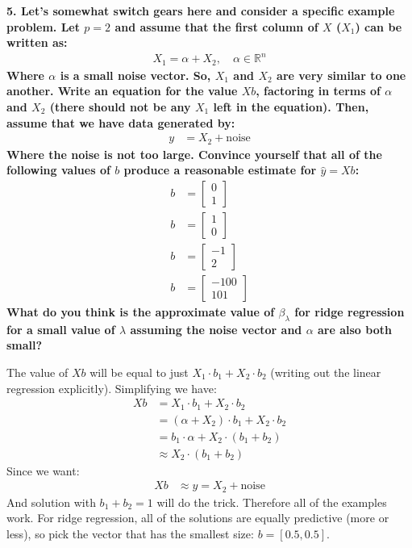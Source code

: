 \documentclass[12pt,hidelinks]{article}
\numberwithin{equation}{section}
\begin{document}
\vspace*{12pt}

\textbf{5. Let's somewhat switch gears here and consider a specific example problem.
Let $p=2$ and assume that the first column of $X$ ($X_1$) can be written as:}
\begin{align}
X_1 = \alpha + X_2, \quad \alpha \in \mathbb{R}^n
\end{align}
\textbf{Where $\alpha$ is a small noise vector. So, $X_1$ and $X_2$ are very similar to
one another. Write an equation for the value $X b$, factoring in terms of $\alpha$
and $X_2$ (there should not be any $X_1$ left in the equation). Then, assume that
we have data generated by:}
\begin{align}
y &= X_2 + \text{noise}
\end{align}
\textbf{Where the noise is not too large. Convince yourself that all of the following
values of $b$ produce a reasonable estimate for $\widehat{y} = X b$:}
\begin{align}
b &= \begin{bmatrix} 0 \\ 1 \end{bmatrix} \\
b &= \begin{bmatrix} 1 \\ 0 \end{bmatrix} \\
b &= \begin{bmatrix} -1 \\ 2 \end{bmatrix} \\
b &= \begin{bmatrix} -100 \\ 101 \end{bmatrix}
\end{align}
\textbf{What do you think is the approximate value of $\beta_\lambda$ for ridge
regression for a small value of $\lambda$ assuming the noise vector and $\alpha$
are also both small?}

\vspace*{12pt}

The value of $X b$ will be equal to just $X_1 \cdot b_1 + X_2 \cdot b_2$ (writing
out the linear regression explicitly). Simplifying we have:
\begin{align}
X b &= X_1 \cdot b_1 + X_2 \cdot b_2 \\
&= (\alpha + X_2) \cdot b_1 + X_2 \cdot b_2 \\
&= b_1 \cdot \alpha + X_2 \cdot (b_1 + b_2) \\
&\approx X_2 \cdot (b_1 + b_2)
\end{align}
Since we want:
\begin{align}
X b &\approx y = X_2 + \text{noise}
\end{align}
And solution with $b_1 + b_2 = 1$ will do the trick. Therefore all of the examples
work. For ridge regression, all of the solutions are equally predictive (more or
less), so pick the vector that has the smallest size: $b = [0.5, 0.5]$.
\end{document}
